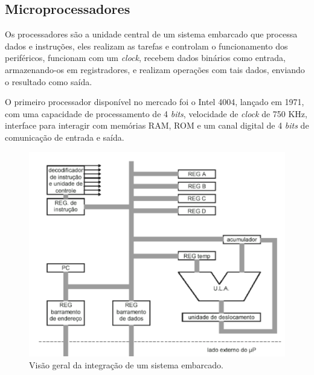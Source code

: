 \subsection{Microprocessadores}

Os processadores são a unidade central de um sistema embarcado que processa dados e instruções, eles realizam as tarefas e controlam o funcionamento dos periféricos, funcionam com um \textit{clock}, recebem dados binários como entrada, armazenando-os em registradores, e realizam operações com tais dados, enviando o resultado como saída. 

O primeiro processador disponível no mercado foi o Intel 4004, lançado em 1971, com uma capacidade de processamento de 4 \textit{bits}, velocidade de \textit{clock} de 750 KHz,  interface para interagir com memórias \ac{RAM}, \ac{ROM} e um canal digital de 4 \textit{bits} de comunicação de entrada e saída. 

\begin{figure}[ht]
    \begin{center}
    \includegraphics{figuras/processor.PNG}
    \end{center}
    \caption[Sistema embarcado]{Visão geral da integração de um sistema embarcado.}
    \label{processor}
\end{figure}

